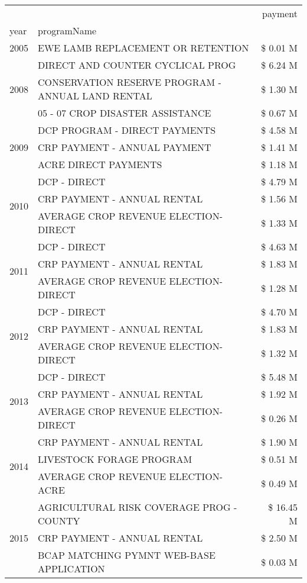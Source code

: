 \begin{tabular}{llr}
\toprule
 &  & payment \\
year & programName &  \\
\midrule
2005 & EWE LAMB REPLACEMENT OR RETENTION & \$ 0.01 M \\
\cline{1-3}
\multirow[t]{3}{*}{2008} & DIRECT AND COUNTER CYCLICAL PROG & \$ 6.24 M \\
 & CONSERVATION RESERVE PROGRAM - ANNUAL LAND RENTAL & \$ 1.30 M \\
 & 05 - 07 CROP DISASTER ASSISTANCE & \$ 0.67 M \\
\cline{1-3}
\multirow[t]{3}{*}{2009} & DCP PROGRAM - DIRECT PAYMENTS & \$ 4.58 M \\
 & CRP PAYMENT - ANNUAL PAYMENT & \$ 1.41 M \\
 & ACRE DIRECT PAYMENTS & \$ 1.18 M \\
\cline{1-3}
\multirow[t]{3}{*}{2010} & DCP - DIRECT & \$ 4.79 M \\
 & CRP PAYMENT - ANNUAL RENTAL & \$ 1.56 M \\
 & AVERAGE CROP REVENUE ELECTION-DIRECT & \$ 1.33 M \\
\cline{1-3}
\multirow[t]{3}{*}{2011} & DCP - DIRECT & \$ 4.63 M \\
 & CRP PAYMENT - ANNUAL RENTAL & \$ 1.83 M \\
 & AVERAGE CROP REVENUE ELECTION-DIRECT & \$ 1.28 M \\
\cline{1-3}
\multirow[t]{3}{*}{2012} & DCP - DIRECT & \$ 4.70 M \\
 & CRP PAYMENT - ANNUAL RENTAL & \$ 1.83 M \\
 & AVERAGE CROP REVENUE ELECTION-DIRECT & \$ 1.32 M \\
\cline{1-3}
\multirow[t]{3}{*}{2013} & DCP - DIRECT & \$ 5.48 M \\
 & CRP PAYMENT - ANNUAL RENTAL & \$ 1.92 M \\
 & AVERAGE CROP REVENUE ELECTION-DIRECT & \$ 0.26 M \\
\cline{1-3}
\multirow[t]{3}{*}{2014} & CRP PAYMENT - ANNUAL RENTAL & \$ 1.90 M \\
 & LIVESTOCK FORAGE PROGRAM & \$ 0.51 M \\
 & AVERAGE CROP REVENUE ELECTION-ACRE & \$ 0.49 M \\
\cline{1-3}
\multirow[t]{3}{*}{2015} & AGRICULTURAL RISK COVERAGE PROG - COUNTY & \$ 16.45 M \\
 & CRP PAYMENT - ANNUAL RENTAL & \$ 2.50 M \\
 & BCAP MATCHING PYMNT WEB-BASE APPLICATION & \$ 0.03 M \\

\end{tabular}
